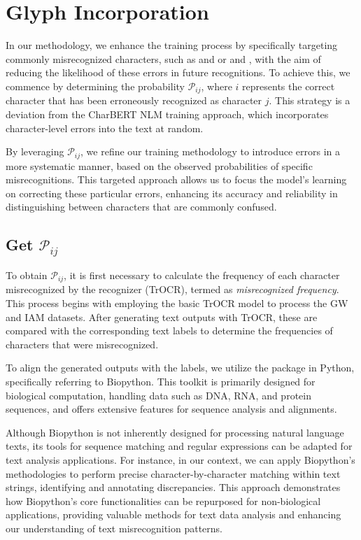 \section{Glyph Incorporation}
\label{sec:3_glyph_incorporation}
In our methodology, we enhance the training process by specifically targeting commonly misrecognized characters, such as  and \say{,} or  and , with the aim of reducing the likelihood of these errors in future recognitions. To achieve this, we commence by determining the probability $\mathcal{P}_{ij}$, where $i$ represents the correct character that has been erroneously recognized as character $j$. This strategy is a deviation from the CharBERT NLM training approach, which incorporates character-level errors into the text at random.

By leveraging $\mathcal{P}_{ij}$, we refine our training methodology to introduce errors in a more systematic manner, based on the observed probabilities of specific misrecognitions. This targeted approach allows us to focus the model's learning on correcting these particular errors, enhancing its accuracy and reliability in distinguishing between characters that are commonly confused.

\subsection{Get $\mathcal{P}_{ij}$}
\label{subsec:3_get_pij}
To obtain $\mathcal{P}_{ij}$, it is first necessary to calculate the frequency of each character misrecognized by the recognizer (TrOCR), termed as \emph{misrecognized frequency}. This process begins with employing the basic TrOCR model to process the GW and IAM datasets. After generating text outputs with TrOCR, these are compared with the corresponding text labels to determine the frequencies of characters that were misrecognized.

To align the generated outputs with the labels, we utilize the  package in Python, specifically referring to Biopython. This toolkit is primarily designed for biological computation, handling data such as DNA, RNA, and protein sequences, and offers extensive features for sequence analysis and alignments.

Although Biopython is not inherently designed for processing natural language texts, its tools for sequence matching and regular expressions can be adapted for text analysis applications. For instance, in our context, we can apply Biopython’s methodologies to perform precise character-by-character matching within text strings, identifying and annotating discrepancies. This approach demonstrates how Biopython’s core functionalities can be repurposed for non-biological applications, providing valuable methods for text data analysis and enhancing our understanding of text misrecognition patterns.

